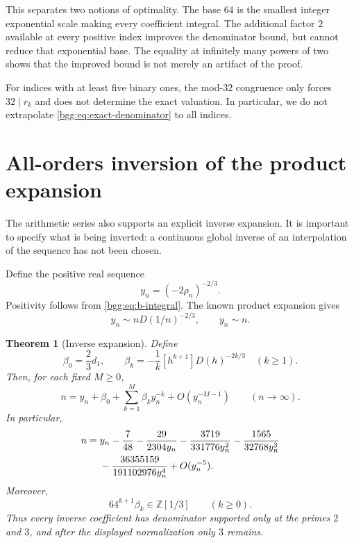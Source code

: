 \documentclass[11pt,a4paper]{article}
\numberwithin{equation}{section}
\newtheorem{theorem}{Theorem}[section]
\theoremstyle{definition}
\theoremstyle{remark}
\theoremstyle{definition}
\newcommand{\Z}{\mathbb Z}
\begin{document}
This separates two notions of optimality. The base $64$ is the smallest
integer exponential scale making every coefficient integral. The additional
factor $2$ available at every positive index improves the denominator bound,
but cannot reduce that exponential base. The equality at infinitely many
powers of two shows that the improved bound is not merely an artifact of the
proof.

For indices with at least five binary ones, the mod-$32$ congruence only
forces $32\mid r_k$ and does not determine the exact valuation. In particular,
we do not extrapolate \eqref{bgg:eq:exact-denominator} to all indices.

\section{All-orders inversion of the product expansion}
\label{bgg:sec:inversion}

The arithmetic series also supports an explicit inverse expansion. It is
important to specify what is being inverted: a continuous global inverse of
an interpolation of the sequence has not been chosen.

Define the positive real sequence
\begin{equation}\label{bgg:eq:y-definition}
 y_n=(-2\rho_n)^{-2/3}.
\end{equation}
Positivity follows from \eqref{bgg:eq:b-integral}. The known product expansion
gives
\begin{equation}\label{bgg:eq:forward-inversion}
 y_n\sim nD(1/n)^{-2/3},\qquad y_n\sim n.
\end{equation}

\begin{theorem}[Inverse expansion]\label{bgg:thm:inverse}
Define
\begin{equation}\label{bgg:eq:inverse-coefficients}
 \beta_0=\frac23d_1,\qquad
 \beta_k=-\frac1k[h^{k+1}]D(h)^{-2k/3}\quad(k\ge1).
\end{equation}
Then, for each fixed $M\ge0$,
\begin{equation}\label{bgg:eq:inverse-expansion}
 n=y_n+\beta_0+\sum_{k=1}^{M}\beta_ky_n^{-k}
      +O(y_n^{-M-1})\qquad(n\to\infty).
\end{equation}
In particular,
\begin{align}\label{bgg:eq:displayed-inverse}
 n={}&y_n-\frac7{48}-\frac{29}{2304y_n}
       -\frac{3719}{331776y_n^2}-\frac{1565}{32768y_n^3}\notag\\
    &-\frac{36355159}{191102976y_n^4}+O(y_n^{-5}).
\end{align}
Moreover,
\begin{equation}\label{bgg:eq:inverse-arithmetic}
 64^{k+1}\beta_k\in\Z[1/3]\qquad(k\ge0).
\end{equation}
Thus every inverse coefficient has denominator supported only at the primes
$2$ and $3$, and after the displayed normalization only $3$ remains.
\end{theorem}
\end{document}
